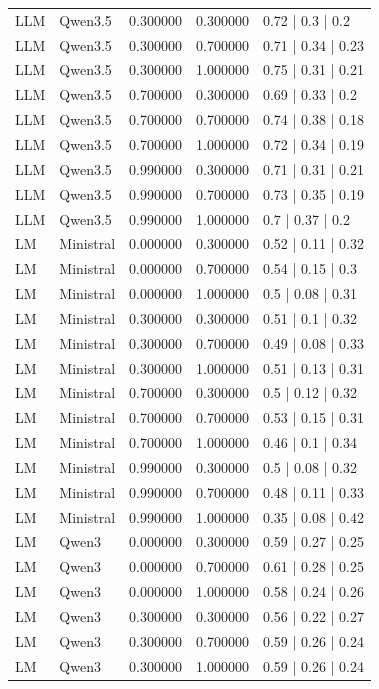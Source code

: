 \begin{longtable}{lllll}
LLM & Qwen3.5 & 0.300000 & 0.300000 & 0.72 | 0.3 | 0.2 \\
LLM & Qwen3.5 & 0.300000 & 0.700000 & 0.71 | 0.34 | 0.23 \\
LLM & Qwen3.5 & 0.300000 & 1.000000 & 0.75 | 0.31 | 0.21 \\
LLM & Qwen3.5 & 0.700000 & 0.300000 & 0.69 | 0.33 | 0.2 \\
LLM & Qwen3.5 & 0.700000 & 0.700000 & 0.74 | 0.38 | 0.18 \\
LLM & Qwen3.5 & 0.700000 & 1.000000 & 0.72 | 0.34 | 0.19 \\
LLM & Qwen3.5 & 0.990000 & 0.300000 & 0.71 | 0.31 | 0.21 \\
LLM & Qwen3.5 & 0.990000 & 0.700000 & 0.73 | 0.35 | 0.19 \\
LLM & Qwen3.5 & 0.990000 & 1.000000 & 0.7 | 0.37 | 0.2 \\
LM & Ministral & 0.000000 & 0.300000 & 0.52 | 0.11 | 0.32 \\
LM & Ministral & 0.000000 & 0.700000 & 0.54 | 0.15 | 0.3 \\
LM & Ministral & 0.000000 & 1.000000 & 0.5 | 0.08 | 0.31 \\
LM & Ministral & 0.300000 & 0.300000 & 0.51 | 0.1 | 0.32 \\
LM & Ministral & 0.300000 & 0.700000 & 0.49 | 0.08 | 0.33 \\
LM & Ministral & 0.300000 & 1.000000 & 0.51 | 0.13 | 0.31 \\
LM & Ministral & 0.700000 & 0.300000 & 0.5 | 0.12 | 0.32 \\
LM & Ministral & 0.700000 & 0.700000 & 0.53 | 0.15 | 0.31 \\
LM & Ministral & 0.700000 & 1.000000 & 0.46 | 0.1 | 0.34 \\
LM & Ministral & 0.990000 & 0.300000 & 0.5 | 0.08 | 0.32 \\
LM & Ministral & 0.990000 & 0.700000 & 0.48 | 0.11 | 0.33 \\
LM & Ministral & 0.990000 & 1.000000 & 0.35 | 0.08 | 0.42 \\
LM & Qwen3 & 0.000000 & 0.300000 & 0.59 | 0.27 | 0.25 \\
LM & Qwen3 & 0.000000 & 0.700000 & 0.61 | 0.28 | 0.25 \\
LM & Qwen3 & 0.000000 & 1.000000 & 0.58 | 0.24 | 0.26 \\
LM & Qwen3 & 0.300000 & 0.300000 & 0.56 | 0.22 | 0.27 \\
LM & Qwen3 & 0.300000 & 0.700000 & 0.59 | 0.26 | 0.24 \\
LM & Qwen3 & 0.300000 & 1.000000 & 0.59 | 0.26 | 0.24 \\

\end{longtable}
